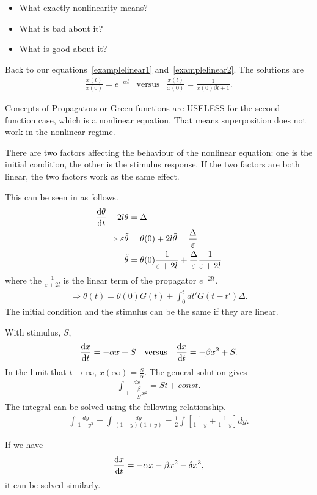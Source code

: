 \begin{itemize}
\item What exactly nonlinearity means?
\item What is bad about it?
\item What is good about it?
\end{itemize}

Back to our equations~\eqref{examplelinear1} and~\eqref{examplelinear2}. The solutions are 
\begin{equation}
\begin{array}{ccc}
\boxed{\frac{x(t)}{x(0)}=e^{-\alpha t}} & \text{versus} & \boxed{\frac{x(t)}{x(0)}=\frac{1}{x(0)\beta t +1}}.
\end{array}
\end{equation}

Concepts of Propagators or Green functions are USELESS for the second function case, which is a  nonlinear equation. That means superposition does not work in the nonlinear regime. 

There are two factors affecting the behaviour of the nonlinear equation:
one is the initial condition, the other is the stimulus response. 
If the two factors are both linear, the two factors work as the same effect.

This can be seen in as follows.
\begin{align}
\frac{{\mathrm d} {\theta}}{{\mathrm d}t}+ 2l \theta &= \Delta\\
\Rightarrow \varepsilon \tilde{\theta} &= \theta(0)+2l \tilde{\theta}=\frac{\Delta}{\varepsilon}\\
\tilde{\theta}&= \theta(0)\frac{1}{\varepsilon +2l}+ \frac{\Delta}{\varepsilon}\frac{1}{\varepsilon +2l}
\end{align}
where the $ \frac{1}{\varepsilon + 2l} $ is the linear term of the propagator $ e^{-2lt} $.
\begin{align}
\Rightarrow \theta(t)= \theta(0) G(t)+ \int_0^t dt' G(t-t')\Delta.
\end{align}
The initial condition and the stimulus can be the same if they are linear.

With stimulus, $ S $,
\begin{align}
\frac{{\mathrm d} {x}}{{\mathrm d}t}= -\alpha x +S\quad \text{versus} \quad \frac{{\mathrm d} {x}}{{\mathrm d}t}= -\beta x^2 +S.
\end{align}
In the limit that $ t\rightarrow \infty $, $ x(\infty)=\frac{S}{\alpha} $. 
The general solution gives
\begin{align}
\int \frac{dx}{1-\dfrac{\beta}{S}x^2}= St+const.
\end{align}
The integral can be solved using the following relationship.
\begin{align}
\int \frac{dy}{1-y^2}= \int \frac{dy}{(1-y)(1+y)}=\frac{1}{2} \int \left[\frac{1}{1-y}+ \frac{1}{1+y} \right]dy.
\end{align}

If we have 
\begin{align}
\frac{{\mathrm d} {x}}{{\mathrm d}t}=-\alpha x -\beta x^2- \delta x^3,
\end{align}
it can be solved similarly. 